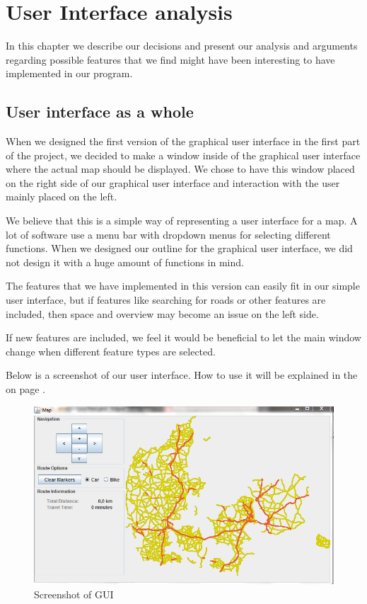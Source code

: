 \chapter{User Interface analysis}
\label{UIA}
In this chapter we describe our decisions and present our analysis and
arguments regarding possible features that we find might have been interesting
to have implemented in our  program.

\section{User interface as a whole}
\label{UIA-UIW}
When we designed the first version of the graphical user interface in the first
part of the project, we decided to make a window inside of the graphical user
interface where the actual map should be displayed. We chose to have this
window placed on the right side of our graphical user interface and interaction
with the user mainly placed on the left.

We believe that this is a simple way of representing a user interface for a map.
A lot of software use a menu bar with dropdown menus for selecting different
functions. When we designed our outline for the graphical user interface, we did
not design it with a huge amount of functions in mind. 

The features that we have implemented in this version can easily fit in our
simple user interface, but if features like searching for roads or other
features are included, then space and overview may become an issue on the left side.

If new features are included, we feel it would be beneficial to let the main
window change when different feature types are selected.

Below is a screenshot of our user interface. How to use it will be
explained in the  on page \pageref{MAN}.

\begin{figure}[!ht]
\centering
\includegraphics[width=1\linewidth]{images/PictureOfUI}
\caption{Screenshot of GUI}
\label{UIA-UIW-PIC}
\end{figure}

